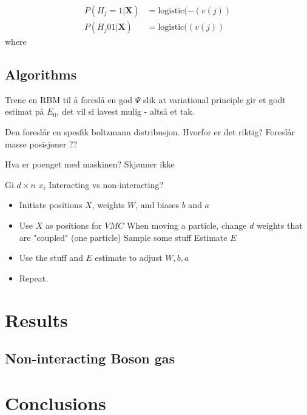\documentclass[%
oneside,                 %
final,                   %
10pt]{article}
\begin{document}
\begin{equation}
\begin{aligned}
P(H_j=1|\bm X) & = \text{logistic} (-(v(j)) \\
P(H_j01|\bm X) &= \text{logistic} ((v(j))
\end{aligned}
\label{eq:probsgibs}
\end{equation}
where 


\subsection{Algorithms}
Trene en RBM til å foreslå en god $\Psi$ slik at variational principle gir et godt estimat på $E_0$, det vil si lavest mulig - altså et tak. 

Den foreslår en spesfik boltzmann distribusjon. Hvorfor er det riktig? Foreslår masse posisjoner ??

Hva er poenget med maskinen? Skjønner ikke

Gi $d \times n$ $x_i$ 
Interacting vs non-interacting?
\begin{itemize}
\item Initiate positions $X$, weights $W$, and biases $b$ and $a$
\item Use $X$ as positions for $VMC$
\subitem When moving a particle, change $d$ weights that are "coupled" (one particle)
\subitem Sample some stuff
\subitem Estimate $E$
\item Use the stuff and $E$ estimate to adjust $W,b,a$
\item Repeat.
\end{itemize}



\section{Results} \label{results}
\subsection{Non-interacting Boson gas}

\section{Conclusions} \label{conclusions}


 \label{refer}

\end{document}
